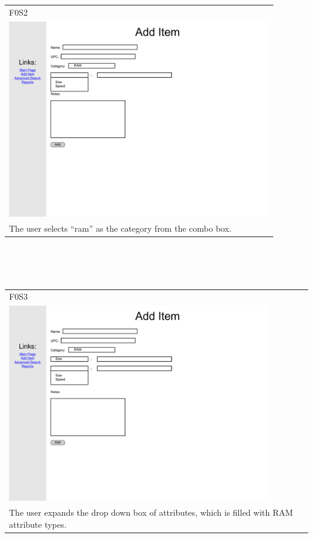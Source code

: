\documentclass{article}
\begin{document}
~\\
~\\
\begin{tabular}{ p{4.5in} }
F0S2\\
\includegraphics[keepaspectratio, width=4.5in]{addItemF0S2.pdf}  \\
The user selects ``ram'' as the category from the combo box.
\end{tabular}\\
~\\
~\\
\begin{tabular}{ p{4.5in} }
F0S3\\
\includegraphics[keepaspectratio, width=4.5in]{addItemF0S3.pdf}\\
The user expands the drop down box of attributes, which is filled with RAM attribute types.
\end{tabular}\\
~\\
\end{document}
